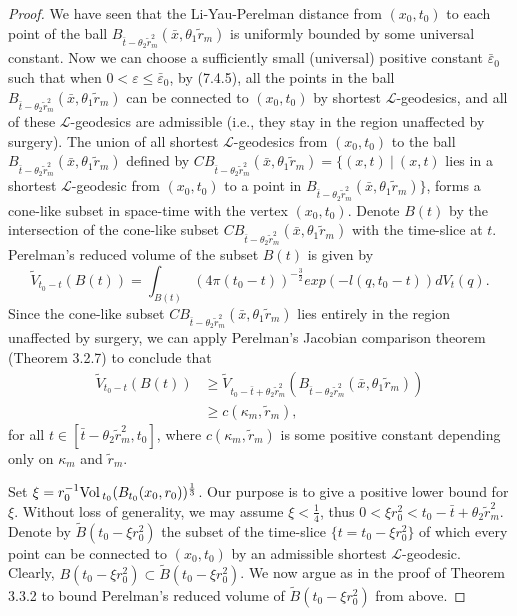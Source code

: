 \begin{proof}
We have seen that the Li-Yau-Perelman distance from $(x_0,t_0)$ to
each point of the ball
$B_{\bar{t}-\theta_2\widetilde{r}^2_m}(\bar{x},\theta_1\widetilde{r}_m)$
is uniformly bounded by some universal constant. Now we can choose
a sufficiently small (universal) positive constant
$\bar{\varepsilon}_0$ such that when $0<\varepsilon \leq
\bar{\varepsilon}_0$, by (7.4.5), all the points in the ball
$B_{\bar{t}-\theta_2\widetilde{r}^2_m}(\bar{x},\theta_1\widetilde{r}_m)$
can be connected to $(x_0,t_0)$ by shortest
$\mathcal{L}$-geodesics, and all of these $\mathcal{L}$-geodesics
are admissible (i.e., they stay in the region unaffected by
surgery). The union of all shortest $\mathcal{L}$-geodesics from
$(x_0,t_0)$ to the ball
$B_{\bar{t}-\theta_2\widetilde{r}^2_m}(\bar{x},
\theta_1\widetilde{r}_m)$ defined by
$CB_{\bar{t}-\theta_2\widetilde{r}^2_m}(\bar{x},
\theta_1\widetilde{r}_m)=\{(x,t)\ |\ (x,t)$ lies in a shortest
$\mathcal{L}$-geodesic from $(x_0,t_0)$ to a point in
$B_{\bar{t}-\theta_2\widetilde{r}^2_m}(\bar{x},
\theta_1\widetilde{r}_m)\}$, forms a cone-like subset in
space-time with the vertex $(x_0,t_0)$. Denote $B(t)$ by the
intersection of the cone-like subset
$CB_{\bar{t}-\theta_2\widetilde{r}^2_m}(\bar{x},\theta_1\widetilde{r}_m)$
with the time-slice at $t$. Perelman's reduced volume of the
subset $B(t)$ is given by
$$
\widetilde{V}_{t_0-t}(B(t))
=\int_{B(t)}(4\pi(t_0-t))^{-\frac{3}{2}}exp(-l(q,t_0-t))dV_t(q).
$$
Since the cone-like subset
$CB_{\bar{t}-\theta_2\widetilde{r}^2_m}(\bar{x},\theta_1\widetilde{r}_m)$
lies entirely in the region unaffected by surgery, we can apply
Perelman's Jacobian comparison theorem (Theorem 3.2.7) to conclude
that
\begin{align}
\widetilde{V}_{t_0-t}(B(t))& \geq
\widetilde{V}_{t_0-\bar{t}+\theta_2\widetilde{r}^2_m}
(B_{\bar{t}-\theta_2\widetilde{r}^2_m}(\bar{x},
\theta_1\widetilde{r}_m))\\
&  \geq c(\kappa_m,\widetilde{r}_m), \nonumber
\end{align}  %
for all $t\in[\bar{t}-\theta_2\widetilde{r}^2_m,t_0]$, where
$c(\kappa_m,\widetilde{r}_m)$ is some positive constant depending
only on $\kappa_m$ and $\widetilde{r}_m$.

Set $\xi=r^{-1}_0{\rm Vol}\,_{t_0}(B_{t_0}(x_0,r_0))^{\frac{1}{3}}$. Our
purpose is to give a positive lower bound for $\xi$. Without loss
of generality, we may assume $\xi<\frac{1}{4}$, thus $0<\xi
r^2_0<t_0-\bar{t}+\theta_2\widetilde{r}^2_m$. Denote by
$\widetilde{B}(t_0-\xi r^2_0)$ the subset of the time-slice
$\{t=t_0-\xi r^2_0\}$ of which every point can be connected to
$(x_0,t_0)$ by an admissible shortest $\mathcal{L}$-geodesic.
Clearly, $B(t_0-\xi r^2_0)\subset\widetilde{B}(t_0-\xi r^2_0)$. We
now argue as in the proof of Theorem 3.3.2 to bound Perelman's
reduced volume of $\widetilde{B}(t_0-\xi r^2_0)$ from above.


\end{proof}
